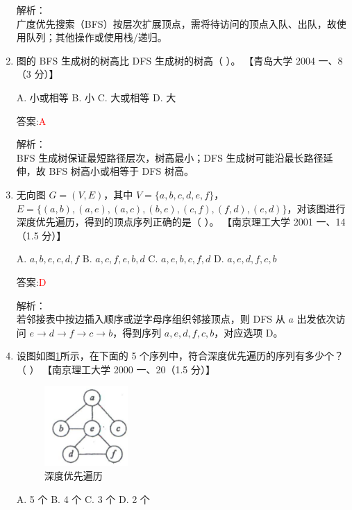 \documentclass[lang=cn,newtx,10pt,scheme=chinese]{../../../elegantbook}
\begin{document}
\begin{enumerate}
    解析：\\
    广度优先搜索（BFS）按层次扩展顶点，需将待访问的顶点入队、出队，故使用队列；其他操作或使用栈/递归。\\

\item 图的 BFS 生成树的树高比 DFS 生成树的树高（ ）。  
    【青岛大学 2004 一、8（3 分）】

    A. 小或相等  
    B. 小  
    C. 大或相等  
    D. 大  

    答案:\textcolor{red}{A}

    解析：\\
    BFS 生成树保证最短路径层次，树高最小；DFS 生成树可能沿最长路径延伸，故 BFS 树高小或相等于 DFS 树高。\\

\item 无向图 $G=(V,E)$，其中 $V=\{a,b,c,d,e,f\}$，$E=\{(a,b),(a,e),(a,c),(b,e),(c,f),(f,d),(e,d)\}$，对该图进行深度优先遍历，得到的顶点序列正确的是（ ）。  
    【南京理工大学 2001 一、14（1.5 分）】

    A. $a,b,e,c,d,f$  
    B. $a,c,f,e,b,d$  
    C. $a,e,b,c,f,d$  
    D. $a,e,d,f,c,b$  

    答案:\textcolor{red}{D}

    解析：\\
    若邻接表中按边插入顺序或逆字母序组织邻接顶点，则 DFS 从 $a$ 出发依次访问 $e\to d\to f\to c\to b$，得到序列 $a,e,d,f,c,b$，对应选项 D。\\

    
        \item 设图如图\ref{fig:7-53}所示，在下面的 5 个序列中，符合深度优先遍历的序列有多少个？（ ）  
        【南京理工大学 2000 一、20（1.5 分）】  

        \begin{figure}[h!]
            \centering
            \includegraphics[width=0.3\textwidth]{../../figure/exercisePicPDF/chapter7/7-53.pdf}
            \caption{深度优先遍历}
            \label{fig:7-53}
    \end{figure}

        A. 5 个 \quad B. 4 个 \quad C. 3 个 \quad D. 2 个  
    

\end{enumerate}
\end{document}
